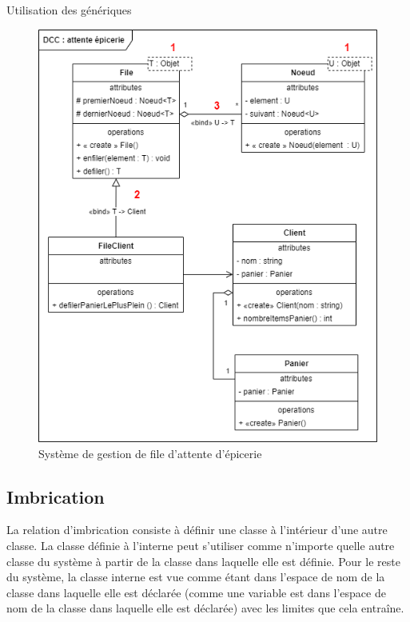 \begin{exemple}{Utilisation des génériques}
	\begin{figure}[H]
		\caption{Système de gestion de file d'attente d'épicerie}
		\centering
		\includegraphics[scale=0.7]{exemple-dcc-file-attente.png}
	\end{figure}
	
\end{exemple}

\subsection{Imbrication}

La relation d'imbrication consiste à définir une classe à l'intérieur d'une autre classe. La classe définie à l'interne peut s'utiliser comme n'importe quelle autre classe du système à partir de la classe dans laquelle elle est définie. Pour le reste du système, la classe interne est vue comme étant dans l'espace de nom de la classe dans laquelle elle est déclarée (comme une variable est dans l'espace de nom de la classe dans laquelle elle est déclarée) avec les limites que cela entraîne.\\

